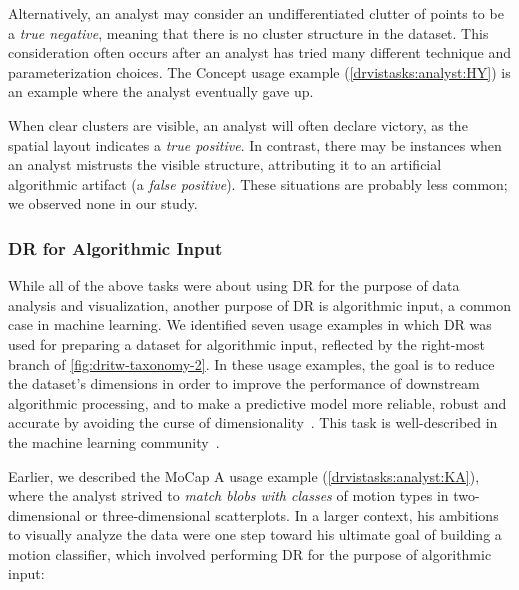 Alternatively, an analyst may consider an undifferentiated clutter of points to be a {\it true negative}, meaning that there is no cluster structure in the dataset. 
This consideration often occurs after an analyst has tried many different technique and parameterization choices. 
The {\sc Concept} usage example (\ref{drvistasks:analyst:HY}) is an example where the analyst eventually gave up. 

When clear clusters are visible, an analyst will often declare victory, as the spatial layout indicates a {\it true positive}. 
In contrast, there may be instances when an analyst mistrusts the visible structure, attributing it to an artificial algorithmic artifact (a {\it false positive}). 
These situations are probably less common; we observed none in our study.


\subsubsection{DR for Algorithmic Input}
\label{app:drvistasks:dritw:taxonomy:algo}


While all of the above tasks were about using \ac{DR} for the purpose of data analysis and visualization, another purpose of \ac{DR} is algorithmic input, a common case in machine learning.
We identified seven usage examples in which \ac{DR} was used for preparing a dataset for algorithmic input, reflected by the right-most branch of \autoref{fig:dritw-taxonomy-2}. 
In these usage examples, the goal is to reduce the dataset's dimensions in order to improve the performance of downstream algorithmic processing, and to make a predictive model more reliable, robust and accurate by avoiding the curse of dimensionality~\cite{Bellman1961}. 
This task is well-described in the machine learning community~\cite{Murphy2012}. 

Earlier, we described the {\sc MoCap A} usage example (\ref{drvistasks:analyst:KA}), where the analyst strived to {\it match blobs with classes} of motion types in two-dimensional or three-dimensional scatterplots.
In a larger context, his ambitions to visually analyze the data were one step toward his ultimate goal of building a motion classifier, which involved performing \ac{DR} for the purpose of algorithmic input: 

